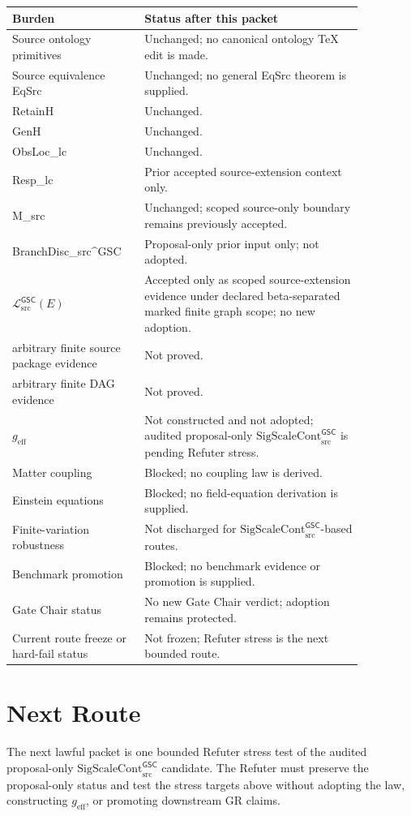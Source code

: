 \documentclass[11pt]{article}
\newcommand{\MetricData}{\mathcal{L}_{\mathrm{src}}^{\mathsf{GSC}}}
\newcommand{\geff}{g_{\mathrm{eff}}}
\newcommand{\SigScaleCont}{\mathrm{SigScaleCont}_{\mathrm{src}}^{\mathsf{GSC}}}
\begin{document}
\begin{longtable}{p{0.30\linewidth}p{0.56\linewidth}}
\toprule
Burden & Status after this packet \\
\midrule
Source ontology primitives & Unchanged; no canonical ontology TeX edit is
made. \\
Source equivalence EqSrc & Unchanged; no general EqSrc theorem is supplied. \\
RetainH & Unchanged. \\
GenH & Unchanged. \\
ObsLoc\_lc & Unchanged. \\
Resp\_lc & Prior accepted source-extension context only. \\
M\_src & Unchanged; scoped source-only boundary remains previously accepted. \\
BranchDisc\_src\textasciicircum GSC & Proposal-only prior input only; not
adopted. \\
\(\MetricData(E)\) & Accepted only as scoped source-extension evidence under
declared beta-separated marked finite graph scope; no new adoption. \\
arbitrary finite source package evidence & Not proved. \\
arbitrary finite DAG evidence & Not proved. \\
\(\geff\) & Not constructed and not adopted; audited proposal-only
\(\SigScaleCont\) is pending Refuter stress. \\
Matter coupling & Blocked; no coupling law is derived. \\
Einstein equations & Blocked; no field-equation derivation is supplied. \\
Finite-variation robustness & Not discharged for \(\SigScaleCont\)-based
routes. \\
Benchmark promotion & Blocked; no benchmark evidence or promotion is supplied. \\
Gate Chair status & No new Gate Chair verdict; adoption remains protected. \\
Current route freeze or hard-fail status & Not frozen; Refuter stress is the
next bounded route. \\
\bottomrule
\end{longtable}

\section{Next Route}

The next lawful packet is one bounded Refuter stress test of the audited
proposal-only \(\SigScaleCont\) candidate. The Refuter must preserve the
proposal-only status and test the stress targets above without adopting the
law, constructing \(\geff\), or promoting downstream GR claims.
\end{document}
